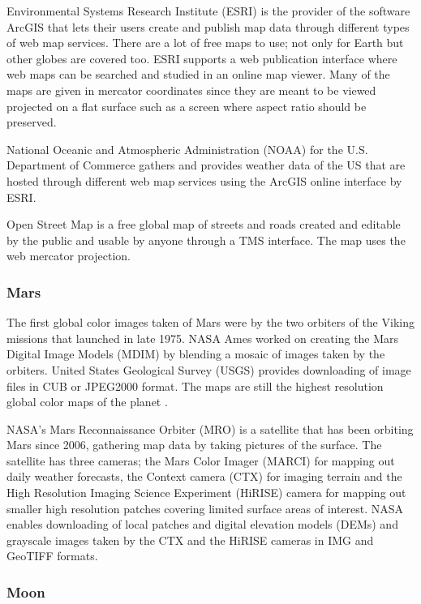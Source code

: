 Environmental Systems Research Institute (ESRI) is the provider of the software ArcGIS that lets their users create and publish map data through different types of web map services. There are a lot of free maps to use; not only for Earth but other globes are covered too. ESRI supports a web publication interface where web maps can be searched and studied in an online map viewer. Many of the maps are given in mercator coordinates since they are meant to be viewed projected on a flat surface such as a screen where aspect ratio should be preserved.

National Oceanic and Atmospheric Administration (NOAA) for the U.S. Department of Commerce gathers and provides weather data of the US that are hosted through different web map services using the ArcGIS online \cite{arcgis} interface by ESRI.

Open Street Map is a free global map of streets and roads created and editable by the public and usable by anyone through a TMS interface. The map uses the web mercator projection.


\subsubsection{Mars}

The first global color images taken of Mars were by the two orbiters of the Viking missions that launched in late 1975. NASA Ames worked on creating the Mars Digital Image Models (MDIM) by blending a mosaic of images taken by the orbiters. United States Geological Survey (USGS) provides downloading of image files in CUB or JPEG2000 format. The maps are still the highest resolution global color maps of the planet \cite{viking}.

NASA's Mars Reconnaissance Orbiter (MRO) is a satellite that has been orbiting Mars since 2006, gathering map data by taking pictures of the surface. The satellite has three cameras; the Mars Color Imager (MARCI) for mapping out daily weather forecasts, the Context camera (CTX) for imaging terrain and the High Resolution Imaging Science Experiment (HiRISE) camera for mapping out smaller high resolution patches covering limited surface areas of interest. NASA enables downloading of local patches and digital elevation models (DEMs) and grayscale images taken by the CTX \cite{ctx} and the HiRISE \cite{hirise} cameras in IMG and GeoTIFF formats.

\subsubsection{Moon}


